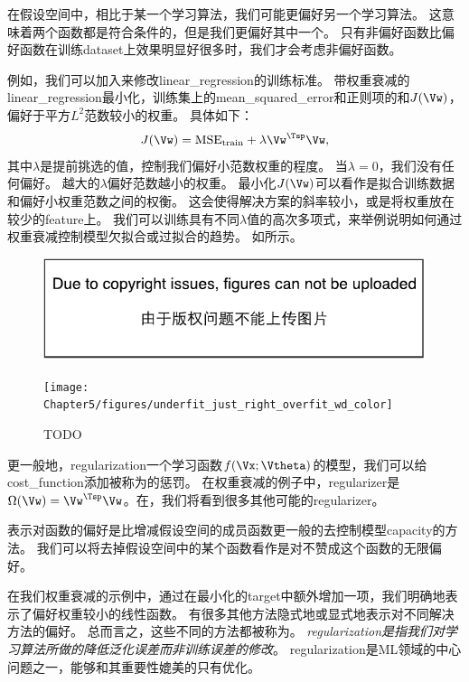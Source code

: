 在假设空间中，相比于某一个学习算法，我们可能更偏好另一个学习算法。
这意味着两个函数都是符合条件的，但是我们更偏好其中一个。
只有非偏好函数比偏好函数在训练\gls{dataset}上效果明显好很多时，我们才会考虑非偏好函数。


例如，我们可以加入来修改\gls{linear_regression}的训练标准。
带权重衰减的\gls{linear_regression}最小化，训练集上的\gls{mean_squared_error}和正则项的和$J(\Vw)$，偏好于平方$L^2$范数较小的权重。
具体如下：
\begin{equation}
    J(\Vw) = \text{MSE}_{\text{train}} + \lambda \Vw^\Tsp \Vw,
\end{equation}
其中$\lambda$是提前挑选的值，控制我们偏好小范数权重的程度。
当$\lambda =0$，我们没有任何偏好。
越大的$\lambda$偏好范数越小的权重。
最小化$J(\Vw)$可以看作是拟合训练数据和偏好小权重范数之间的权衡。
这会使得解决方案的斜率较小，或是将权重放在较少的\gls{feature}上。
我们可以训练具有不同$\lambda$值的高次多项式，来举例说明如何通过权重衰减控制模型欠拟合或过拟合的趋势。
如所示。

\begin{figure}[!htb]
\ifOpenSource
\centerline{\includegraphics{figure.pdf}}
\else
\centerline{\texttt{[image: Chapter5/figures/underfit\_just\_right\_overfit\_wd\_color]}}
\fi
\caption{TODO}
\label{fig:chap5_underfit_just_right_overfit_wd_color}
\end{figure}

更一般地，\gls{regularization}一个学习函数$f(\Vx;\Vtheta)$的模型，我们可以给\gls{cost_function}添加被称为的惩罚。
在权重衰减的例子中，\gls{regularizer}是$\Omega(\Vw) = \Vw^\Tsp \Vw$。在，我们将看到很多其他可能的\gls{regularizer}。


表示对函数的偏好是比增减假设空间的成员函数更一般的去控制模型\gls{capacity}的方法。
我们可以将去掉假设空间中的某个函数看作是对不赞成这个函数的无限偏好。

在我们权重衰减的示例中，通过在最小化的\gls{target}中额外增加一项，我们明确地表示了偏好权重较小的线性函数。
有很多其他方法隐式地或显式地表示对不同解决方法的偏好。
总而言之，这些不同的方法都被称为。
\emph{\gls{regularization}是指我们对学习算法所做的降低泛化误差而非训练误差的修改}。
\gls{regularization}是\gls{ML}领域的中心问题之一，能够和其重要性媲美的只有优化。

